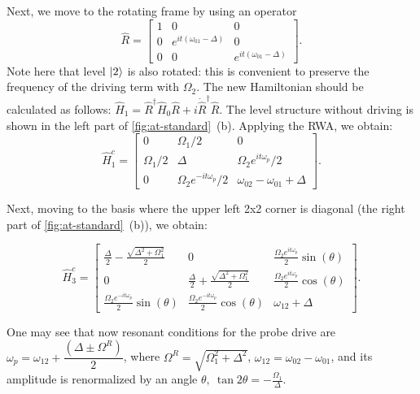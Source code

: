 \documentclass[%
 aip,
 amsmath,amssymb,
 reprint,%
]{revtex4-1}
\begin{document}
Next, we move to the rotating frame by using an operator
\[
\hat R = \left[\begin{matrix} 
1 & 0 & 0\\0 & e^{i t \left(\omega_{01}- \Delta\right)} & 0\\0 & 0 & e^{i t \left(\omega_{01}- \Delta\right)}\end{matrix}\right].
\]
Note here that level $\ket{2}$ is also rotated: this is convenient to preserve the frequency of the driving term with $\Omega_2$. The new Hamiltonian should be calculated as follows: $\hat H_1 = \hat R^\dag \hat H_0 \hat R + i \dot{\hat{R}}^\dag \hat R$. The level structure without driving  is shown in the left part of \autoref{fig:at-standard}~(b). Applying the RWA, we obtain:
\begin{equation*}
\hat H^c_1 = \left[\begin{matrix}0 &\Omega_{1}/2 & 0\\\Omega_{1}/2 & \Delta & \Omega_{2} e^{i t \omega_p}/2\\0 & \Omega_{2} e^{-i t \omega_p}/2 & \omega_{02} - \omega_{01}+\Delta \end{matrix}\right].
\end{equation*}

Next, moving to the basis where the upper left 2x2 corner is diagonal (the right part of \autoref{fig:at-standard}~(b)), we obtain:

\begin{equation*}
\hat H^c_3 = \left[\begin{matrix} 
\frac{\Delta}{2} - \frac{\sqrt{\Delta^{2} + \Omega_{1}^{2}}}{2} & 
0 &
\frac{\Omega_{2} e^{i t \omega_{p}}}{2}\sin(\theta)
\\
0 & 
\frac{\Delta}{2} + \frac{\sqrt{\Delta^{2} + \Omega_{1}^{2}}}{2} & 
\frac{\Omega_{2} e^ {i t \omega_p}}{2}\cos(\theta)
\\
\frac{\Omega_{2} e^{-i t \omega_{p}} }{2}\sin(\theta) & 
\frac{\Omega_{2} e^{-i t \omega_{p}}}{2} \cos(\theta) & 
\omega_{12} +\Delta 
\end{matrix}\right].
\end{equation*}

One may see that now resonant conditions for the probe drive are $\omega_p = \omega_{12} + \dfrac{(\Delta \pm \Omega^R)}{2}$, where $\Omega^R = \sqrt{\Omega_1^2 + \Delta^2}$, $\omega_{12} = \omega_{02}- \omega_{01}$, and its amplitude is renormalized by an angle $\theta,\ \tan 2\theta = -\frac{\Omega_1}{\Delta}$.
\end{document}
